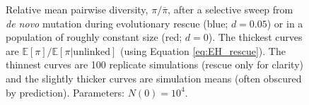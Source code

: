 \documentclass[]{article}
\begin{document}
\begin{figure}[htbp]
\caption{
Relative mean pairwise diversity, $\pi/\overline{\pi}$, after a selective sweep from \textit{de novo} mutation during evolutionary rescue (blue; $d=0.05$) or in a population of roughly constant size (red; $d=0$).
The thickest curves are $\mathbb{E}[\pi]/\mathbb{E}[\pi|\mathrm{unlinked}]$ (using Equation \ref{eq:EH_rescue}).
The thinnest curves are 100 replicate simulations (rescue only for clarity) and the slightly thicker curves are simulation means (often obscured by prediction).
Parameters: $N(0)=10^4$.
}%
\label{fig:rescueDNM_heterozygosity_relative}
\end{figure}
\end{document}
